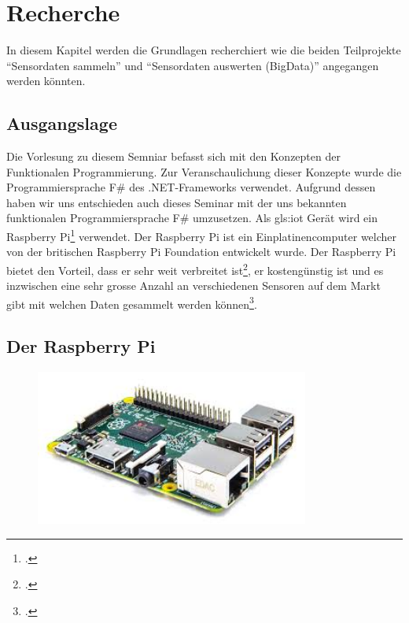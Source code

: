 
\chapter{Recherche}
In diesem Kapitel werden die Grundlagen recherchiert wie die beiden Teilprojekte "`Sensordaten sammeln"' und "`Sensordaten auswerten (BigData)"' angegangen werden könnten.

\section{Ausgangslage}
Die Vorlesung zu diesem Semniar befasst sich mit den Konzepten der Funktionalen Programmierung. Zur Veranschaulichung dieser Konzepte wurde die Programmiersprache F\# des .NET-Frameworks verwendet. Aufgrund dessen haben wir uns entschieden auch dieses Seminar mit der uns bekannten funktionalen Programmiersprache F\# umzusetzen. Als \Gls{gls:iot} Gerät wird ein Raspberry Pi\footcite{Raspberry_Pi_2016-04-24} verwendet. Der Raspberry Pi ist ein Einplatinencomputer welcher von der britischen Raspberry Pi Foundation entwickelt wurde. Der Raspberry Pi bietet den Vorteil, dass er sehr weit verbreitet ist\footcite{Raspberry_Pi_Erfolgsgeschichte_2016-04-24}, er kostengünstig ist und es inzwischen eine sehr grosse Anzahl an verschiedenen Sensoren auf dem Markt gibt mit welchen Daten gesammelt werden können\footcite{Raspberry_Pi_Sensor_2016-04-24}.

\section{Der Raspberry Pi}
\label{sec:recherche:rpi}
\begin{figure}[H]
  \centering
  \includegraphics[width=9cm]{./images/RaspberryPi2ModelB}
\end{figure}
  
